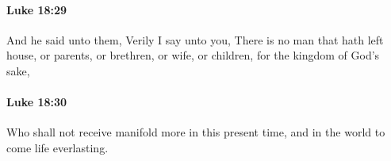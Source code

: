 		\paragraph{Luke 18:29} %
			\label{LUKE-18-29}

			And he said unto them, Verily I say unto you, There is no man that hath left house, or parents, or brethren, or wife, or children, for the kingdom of God's sake,

			\begin{framed}
			\scriptsize
				\begin{compactdesc}
					\item[SBLG] 
				\end{compactdesc}
			\end{framed}

		\paragraph{Luke 18:30} %
			\label{LUKE-18-30}

			Who shall not receive manifold more in this present time, and in the world to come life everlasting.

